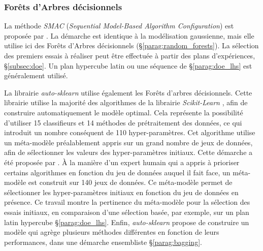 
\subsubsection{Forêts d'Arbres décisionnels} \label{subsubsec:rf_opt}
La méthode \textit{SMAC} (\textit{Sequential Model-Based Algorithm Configuration}) est proposée par \citeauthor{hutter_sequential_2011} \cite{hutter_sequential_2011}.
La démarche est identique à la modélisation gaussienne, mais elle utilise ici des Forêts d'Arbres décisionnels (§\ref{parag:random_forests}).
La sélection des premiers essais à réaliser peut être effectuée à partir des plans d'expériences, §\ref{subsec:doe}.
Un plan hypercube latin ou une séquence de \citeauthor{sobol_distribution_1967} §\ref{parag:doe_lhs} est généralement utilisé.

La librairie \textit{auto-sklearn} \cite{feurer_efficient_2015} utilise également les Forêts d'arbres décisionnels.
Cette librairie utilise la majorité des algorithmes de la librairie \textit{Scikit-Learn} \cite{pedregosa_scikit-learn_2011}, afin de construire automatiquement le modèle optimal.
Cela représente la possibilité d'utiliser 15 classifieurs et 14 méthodes de prétraitement des données, ce qui introduit un nombre conséquent de 110 hyper-paramètres.
Cet algorithme utilise un méta-modèle préalablement appris sur un grand nombre de jeux de données, afin de sélectionner les valeurs des hyper-paramètres initiaux.
Cette démarche a été proposée par \citeauthor{feurer_initializing_2015} \cite{feurer_initializing_2015}.
À la manière d'un expert humain qui a appris à prioriser certains algorithmes en fonction du jeu de données auquel il fait face, un méta-modèle est construit sur 140 jeux de données.
Ce méta-modèle permet de sélectionner les hyper-paramètres initiaux en fonction du jeu de données en présence.
Ce travail montre la pertinence du méta-modèle pour la sélection des essais initiaux, en comparaison d'une sélection basée, par exemple, sur un plan latin hypercube §\ref{parag:doe_lhs}.
Enfin, \textit{auto-sklearn} propose de construire un modèle qui agrège plusieurs méthodes différentes en fonction de leurs performances, dans une démarche ensembliste §\ref{parag:bagging}.

